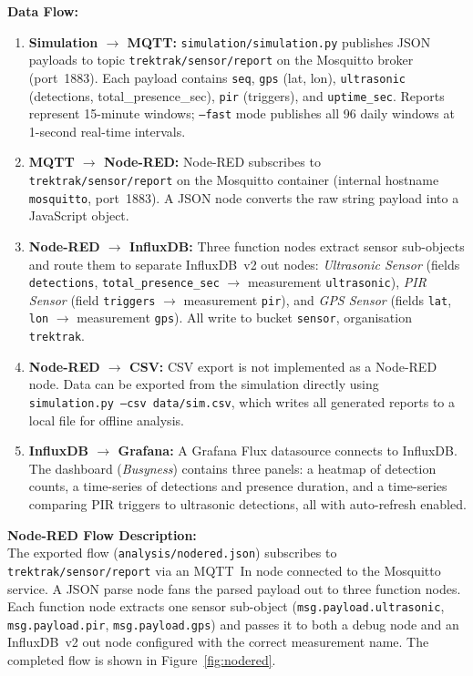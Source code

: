 \documentclass[11pt]{article}
\begin{document}
\noindent\textbf{Data Flow:}
\begin{enumerate}[noitemsep]
    \item \textbf{Simulation $\to$ MQTT:} \texttt{simulation/simulation.py} publishes JSON payloads to topic \texttt{trektrak/sensor/report} on the Mosquitto broker (port~1883). Each payload contains \texttt{seq}, \texttt{gps} (lat, lon), \texttt{ultrasonic} (detections, total\_presence\_sec), \texttt{pir} (triggers), and \texttt{uptime\_sec}. Reports represent 15-minute windows; \texttt{--fast} mode publishes all 96 daily windows at 1-second real-time intervals.
    \item \textbf{MQTT $\to$ Node-RED:} Node-RED subscribes to \texttt{trektrak/sensor/report} on the Mosquitto container (internal hostname \texttt{mosquitto}, port~1883). A JSON node converts the raw string payload into a JavaScript object.
    \item \textbf{Node-RED $\to$ InfluxDB:} Three function nodes extract sensor sub-objects and route them to separate InfluxDB~v2 out nodes: \textit{Ultrasonic Sensor} (fields \texttt{detections}, \texttt{total\_presence\_sec} $\to$ measurement \texttt{ultrasonic}), \textit{PIR Sensor} (field \texttt{triggers} $\to$ measurement \texttt{pir}), and \textit{GPS Sensor} (fields \texttt{lat}, \texttt{lon} $\to$ measurement \texttt{gps}). All write to bucket \texttt{sensor}, organisation \texttt{trektrak}.
    \item \textbf{Node-RED $\to$ CSV:} CSV export is not implemented as a Node-RED node. Data can be exported from the simulation directly using \texttt{simulation.py --csv data/sim.csv}, which writes all generated reports to a local file for offline analysis.
    \item \textbf{InfluxDB $\to$ Grafana:} A Grafana Flux datasource connects to InfluxDB. The dashboard (\textit{Busyness}) contains three panels: a heatmap of detection counts, a time-series of detections and presence duration, and a time-series comparing PIR triggers to ultrasonic detections, all with auto-refresh enabled.
\end{enumerate}

\vspace{0.5em}

\noindent\textbf{Node-RED Flow Description:}\\{}
The exported flow (\texttt{analysis/nodered.json}) subscribes to \texttt{trektrak/sensor/report} via an MQTT~In node connected to the Mosquitto service. A JSON parse node fans the parsed payload out to three function nodes. Each function node extracts one sensor sub-object (\texttt{msg.payload.ultrasonic}, \texttt{msg.payload.pir}, \texttt{msg.payload.gps}) and passes it to both a debug node and an InfluxDB~v2 out node configured with the correct measurement name. The completed flow is shown in Figure~\ref{fig:nodered}.
\end{document}
